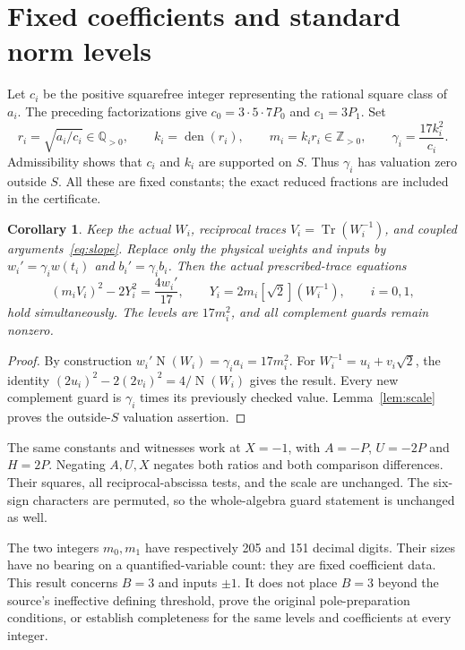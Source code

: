 \documentclass[11pt,a4paper]{article}
\newtheorem{corollary}[theorem]{Corollary}
\newcommand{\Q}{\mathbb Q}\newcommand{\Z}{\mathbb Z}
\DeclareMathOperator{\Tr}{Tr}
\DeclareMathOperator{\N}{N}
\begin{document}
\section{Fixed coefficients and standard norm levels}

Let $c_i$ be the positive squarefree integer representing the rational
square class of $a_i$. The preceding factorizations give
$c_0=3\cdot5\cdot7P_0$ and $c_1=3P_1$. Set
\[
 r_i=\sqrt{a_i/c_i}\in\Q_{>0},\qquad
 k_i=\operatorname{den}(r_i),\qquad m_i=k_ir_i\in\Z_{>0},\qquad
 \gamma_i=\frac{17k_i^2}{c_i}.
\]
Admissibility shows that $c_i$ and $k_i$ are supported on $S$.
Thus $\gamma_i$ has valuation zero outside $S$. All these are fixed
constants; the exact reduced fractions are included in the certificate.

\begin{corollary}\label{cor:incidence}
Keep the actual $W_i$, reciprocal traces $V_i=\Tr(W_i^{-1})$, and
coupled arguments~\eqref{eq:slope}. Replace only the physical weights
and inputs by $w_i'=\gamma_iw(t_i)$ and $b_i'=\gamma_i b_i$.
Then the actual prescribed-trace equations
\[
 (m_iV_i)^2-2Y_i^2=\frac{4w_i'}{17},\qquad
 Y_i=2m_i[\sqrt2](W_i^{-1}),\qquad i=0,1,
\]
hold simultaneously. The levels are $17m_i^2$, and all complement
guards remain nonzero.
\end{corollary}
\begin{proof}
By construction $w_i'\N(W_i)=\gamma_i a_i=17m_i^2$.
For $W_i^{-1}=u_i+v_i\sqrt2$, the identity
$(2u_i)^2-2(2v_i)^2=4/\N(W_i)$ gives the result.
Every new complement guard is $\gamma_i$ times its previously checked
value. Lemma~\ref{lem:scale} proves the outside-$S$ valuation assertion.
\end{proof}

The same constants and witnesses work at $X=-1$, with $A=-P$,
$U=-2P$ and $H=2P$. Negating $A,U,X$ negates both ratios and both
comparison differences. Their squares, all reciprocal-abscissa tests,
and the scale are unchanged. The six-sign characters are permuted,
so the whole-algebra guard statement is unchanged as well.

The two integers $m_0,m_1$ have respectively 205 and 151 decimal digits.
Their sizes have no bearing on a quantified-variable count: they are
fixed coefficient data. This result concerns $B=3$ and inputs $\pm1$.
It does not place $B=3$ beyond the source's ineffective defining
threshold, prove the original pole-preparation conditions, or establish
completeness for the same levels and coefficients at every integer.
\end{document}

